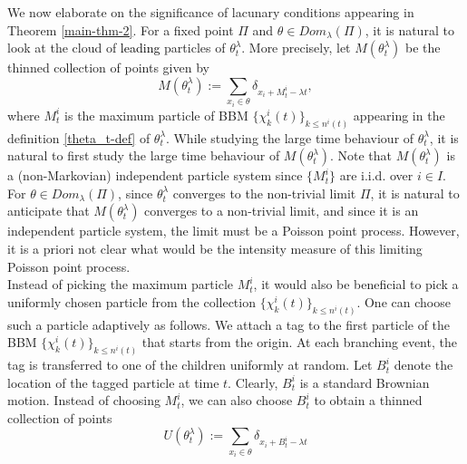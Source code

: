 \documentclass[a4paper,reqno]{amsart}%
\newcommand{\1}{\mathbf 1}
\theoremstyle{mine}
\numberwithin{theorem}{section}
\numberwithin{equation}{section}
\theoremstyle{remark}
\begin{document}
We now elaborate on the significance of lacunary conditions appearing in Theorem \ref{main-thm-2}. For a fixed point $\Pi$ and $\theta \in Dom_{\lambda}(\Pi)$, it is natural to look at the cloud of \textcolor{black}{leading} particles of $\theta_t^\lambda$. More precisely, let $M(\theta_t^\lambda)$ be the thinned collection of points given by 
\begin{equation}\label{def-thinning-M}
    M(\theta_t^\lambda):= \sum\limits_{x_i \in \theta} \delta_{x_i+M_t^i-\lambda t},
\end{equation}
where $M_t^i$ is the maximum particle of BBM $\{\chi_k^i(t)\}_{k \leq n^i(t)}$ appearing in the definition \eqref{theta_t-def} of $\theta_t^\lambda$. While studying the large time behaviour of $\theta_t^\lambda$, it is natural to first study the large time behaviour of $M(\theta_t^\lambda)$. Note that $M(\theta_t^\lambda)$ is a (non-Markovian) independent particle system since $\{M_t^i\}$ are i.i.d. over $i \in I$. For $\theta \in Dom_{\lambda}(\Pi)$, since $\theta_t^\lambda$ converges to the non-trivial limit $\Pi$, it is natural to anticipate that $M(\theta_t^\lambda)$ converges to a non-trivial limit, and since it is an independent particle system, the limit must be a Poisson point process. However, it is a priori not clear what would be the intensity measure of this limiting Poisson point process. \\

Instead of picking the maximum particle $M_t^i$, it would also be beneficial to pick a uniformly chosen particle from the collection $\{\chi_k^i(t)\}_{k \leq n^i(t)}$. One can choose such a particle adaptively as follows. We attach a tag to the first particle of the BBM $\{\chi_k^i(t)\}_{k \leq n^i(t)}$ that starts from the origin. At each branching event, the tag is transferred to one of the children uniformly at random. Let $B_t^i$ denote the location of the tagged particle at time $t$. Clearly, $B_t^i$ is a standard Brownian motion. Instead of choosing $M_t^i$, we can also choose $B_t^i$ to obtain a thinned collection of points 
\begin{equation}\label{def-thinning-U}
    U(\theta_t^\lambda) := \sum\limits_{x_i \in \theta} \delta_{x_i+B_t^i-\lambda t}
\end{equation}
\end{document}
